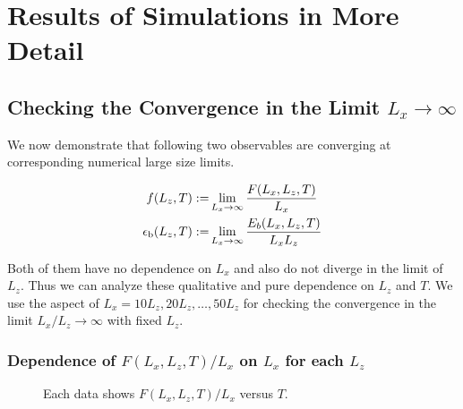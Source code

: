 
\chapter{Results of Simulations in More Detail}

\section{Checking the Convergence in the Limit $L_{x}\to\infty$}
\label{appsec:convcheck}

We now demonstrate that following two observables are converging at corresponding numerical large size limits.

\begin{align}
	f(L_{z}, T):=&\lim_{L_{x}\to\infty}\frac{F(L_{x}, L_{z}, T)}{L_{x}}\\
	\epsilon_{\rm b}(L_{z}, T):=&\lim_{L_{x}\to\infty}\frac{E_{b}(L_{x}, L_{z}, T)}{L_{x}L_{z}}
\end{align}

Both of them have no dependence on $L_{x}$ and also do not diverge in the limit of $L_{z}$. Thus we can analyze these qualitative and pure dependence on $L_{z}$ and $T$. We use the aspect of $L_{x}=10L_{z}, 20L_{z}, \dots, 50L_{z}$ for checking the convergence in the limit $L_{x}/L_{z} \to \infty$ with fixed $L_{z}$.

\subsection{Dependence of $F(L_{x}, L_{z}, T)/L_{x}$ on $L_{x}$ for each $L_{z}$}

\begin{figure}[htbp]
	\centering
	
	
	
	\caption{Each data shows $F(L_{x}, L_{z}, T)/L_{x}$ versus $T$.}
	\label{fig:ffdcheck}
\end{figure}

